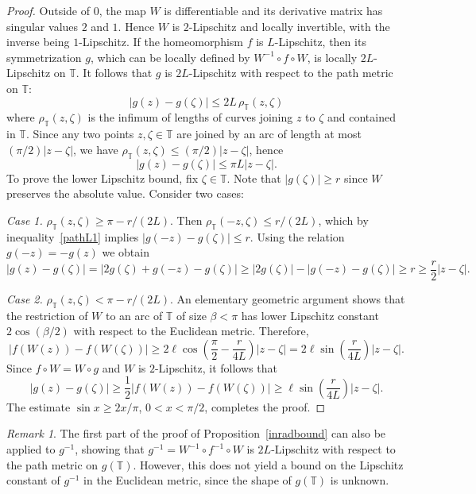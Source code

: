 \documentclass[11pt]{amsart}
\theoremstyle{remark}
\newtheorem{remark}[theorem]{Remark}
\numberwithin{equation}{section}
\newcommand{\T}{\mathbb{T}}
\newcommand{\abs}[1]{\lvert#1\rvert}
\begin{document}
\begin{proof} Outside of $0$, the map $W$ is differentiable and its derivative matrix  has singular values $2$ and $1$. Hence $W$ is $2$-Lipschitz and locally invertible, with the inverse being $1$-Lipschitz. If the homeomorphism $f$ is $L$-Lipschitz, then its symmetrization $g$, which can be locally defined by $W^{-1}\circ f\circ W$, is locally $2L$-Lipschitz on $\T$.  It follows that $g$ is $2L$-Lipschitz with respect to the path metric on $\T$: 
\begin{equation}\label{pathL1}
\abs{g(z)-g(\zeta)}\le 2L\, \rho_{\T}(z,\zeta)
\end{equation}
where $\rho_{\T}(z,\zeta)$ is the infimum of lengths of curves joining $z$ to $\zeta$  and contained in $\T$. 
Since any two points $z,\zeta\in \T$ are joined by an arc of length at most $(\pi/2)\abs{z-\zeta}$, we have $\rho_{\T}(z,\zeta)\le (\pi/2)\abs{z-\zeta}$, hence
\[
\abs{g(z)-g(\zeta)}\le \pi L\abs{z-\zeta}.
\]
To prove the lower Lipschitz bound, fix $\zeta\in\T$. Note that $\abs{g(\zeta)}\ge r$ since $W$ preserves the absolute value. Consider two cases: 

\textit{Case 1.} $\rho_{\T}(z,\zeta)\ge \pi - r/(2L)$. Then $\rho_{\T}(-z, \zeta)\le r/(2L)$, which by inequality~\eqref{pathL1} implies $\abs{g(-z)-g(\zeta)} \le r$. Using the relation $g(-z) = -g(z)$ we obtain
\[
\abs{g(z)-g(\zeta)} = \abs{2g(\zeta) + g(-z)-g(\zeta)}
\ge \abs{2g(\zeta)} - \abs{g(-z)-g(\zeta)} \ge r \ge \frac{r}{2}\abs{z-\zeta}.
\]

\textit{Case 2.} $\rho_{\T}(z,\zeta) < \pi - r/(2L)$. An elementary geometric argument shows that the restriction of $W$ to an arc of $\T$ of size $\beta<\pi$ has lower Lipschitz constant $2\cos(\beta/2)$ with respect to the Euclidean metric. Therefore, 
\[
\abs{f(W(z))-f(W(\zeta))} \ge 2\ell\cos\left(\frac{\pi}{2} - \frac{r}{4L}\right) \abs{z-\zeta} = 2\ell\sin\left(\frac{r}{4L}\right)\abs{z-\zeta}.
\]
Since $f\circ W = W\circ g$ and $W$ is $2$-Lipschitz, it follows that 
\[
\abs{g(z)-g(\zeta)} \ge \frac12 \abs{f(W(z))-f(W(\zeta))} 
\ge \ell\sin\left(\frac{r}{4L}\right)\abs{z-\zeta}.
\]
The estimate $\sin x\ge 2x/\pi$, $0<x<\pi/2$, completes the proof. 
\end{proof}


\begin{remark}
The first part of the proof of Proposition~\ref{inradbound} can also be applied to $g^{-1}$, showing that $g^{-1} = W^{-1}\circ f^{-1}\circ W$ is $2L$-Lipschitz with respect to the path metric on $g(\T)$. However, this does not yield a bound on the Lipschitz constant of $g^{-1}$ in the Euclidean metric, since the shape of $g(\T)$ is unknown. 
\end{remark}
\end{document}
